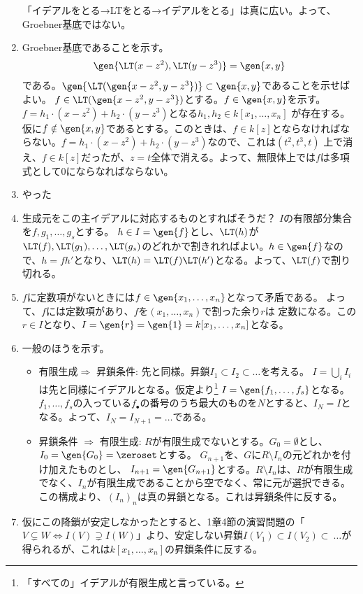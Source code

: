 \begin{enumerate}[label=(問題\arabic*)]
「イデアルをとる→LTをとる→イデアルをとる」は真に広い。よって、Groebner基底ではない。
\item Groebner基底であることを示す。
\begin{align}
  \gen{\LT(x-z^2),\LT(y-z^3)} = \gen{x,y}
\end{align}
である。$\gen{\LT(\gen{x-z^2,y-z^3})}\subset \gen{x,y}$であることを示せばよい。
$f\in \LT(\gen{x-z^2,y-z^3})$とする。$f\in \gen{x,y}$を示す。
$f=h_1\cdot (x-z^2) + h_2 \cdot (y-z^3)$となる$h_1,h_2 \in k[x_1,\dots,x_n]$
が存在する。
仮に$f\notin \gen{x,y}$であるとする。このときは、$f\in k[z]$とならなければならない。$f=h_1\cdot(x-z^2) + h_2\cdot (y-z^3)$なので、これは$(t^2,t^3,t)$
上で消え、$f\in k[z]$だったが、$z=t$全体で消える。よって、無限体上では$f$は多項式として0にならなればならない。
\item やった
\item 生成元をこの主イデアルに対応するものとすればそうだ？
$I$の有限部分集合を$f,g_1,\dots,g_s$とする。
$h\in I = \gen{f}$とし、$\LT(h)$が$\LT(f),\LT(g_1),\dots,\LT(g_s)$のどれかで割きれればよい。$h \in \gen{f}$なので、$h = f h'$となり、$\LT(h) = \LT(f)\LT(h')$となる。よって、$\LT(f)$で割り切れる。
\item $f$に定数項がないときには$f\in \gen{x_1,\dots,x_n}$となって矛盾である。
よって、$f$には定数項があり、$f$を$(x_1,\dots,x_n)$で割った余り$r$は
定数になる。この$r \in I$となり、$I = \gen{r} = \gen{1} = k[x_1,\dots,x_n]$となる。
\item 一般のほうを示す。
\begin{itemize}
  \item 有限生成$\Rightarrow$ 昇鎖条件:
  先と同様。昇鎖$I_1 \subset I_2 \subset \dots$を考える。
  $I=\bigcup_{i} I_i$は先と同様にイデアルとなる。仮定より\footnote{「すべての」イデアルが有限生成と言っている。}
  $I=\gen{f_1,\dots,f_s}$となる。$f_1,\dots,f_s$の入っている$f_\bullet$の番号のうち最大のものを$N$とすると、$I_N = I$となる。よって、$I_{N} = I_{N+1}=\dots$である。
  \item 昇鎖条件 $\Rightarrow$ 有限生成:
  $R$が有限生成でないとする。$G_0 = \emptyset$とし、$I_0 = \gen{G_0} = \zeroset$とする。
  $G_{n+1}$を、$G$に$R\setminus I_n$の元どれかを付け加えたものとし、
  $I_{n+1} = \gen{G_{n+1}}$とする。$R\setminus I_n$は、$R$が有限生成でなく、$I_n$が有限生成であることから空でなく、常に元が選択できる。この構成より、$(I_n)_n$は真の昇鎖となる。これは昇鎖条件に反する。
\end{itemize}
\item 仮にこの降鎖が安定しなかったとすると、1章4節の演習問題の「$V \subsetneq W \iff I(V) \supsetneq I(W)$」より、安定しない昇鎖$I(V_1) \subset I(V_2) \subset\ \dots$が得られるが、これは$k[x_1,\dots,x_n]$の昇鎖条件に反する。

\end{enumerate}
